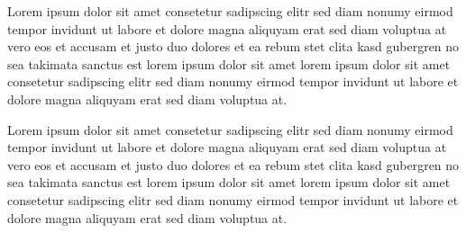 Lorem ipsum dolor sit amet consetetur sadipscing elitr sed diam
nonumy eirmod tempor invidunt ut labore et dolore magna aliquyam
erat sed diam voluptua at vero eos et accusam et justo duo dolores
et ea rebum stet clita kasd gubergren no sea takimata sanctus est
lorem ipsum dolor sit amet lorem ipsum dolor sit amet consetetur
sadipscing elitr sed diam nonumy eirmod tempor invidunt ut labore
et dolore magna aliquyam erat sed diam voluptua at.

Lorem ipsum dolor sit amet consetetur sadipscing elitr sed diam
nonumy eirmod tempor invidunt ut labore et dolore magna aliquyam
erat sed diam voluptua at vero eos et accusam et justo duo dolores
et ea rebum stet clita kasd gubergren no sea takimata sanctus est
lorem ipsum dolor sit amet lorem ipsum dolor sit amet consetetur
sadipscing elitr sed diam nonumy eirmod tempor invidunt ut labore
et dolore magna aliquyam erat sed diam voluptua at.

